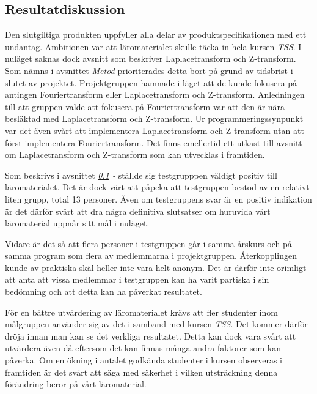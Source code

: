\documentclass[12pt,a4paper,twoside,openright]{article}
\begin{document}
\subsection{Resultatdiskussion}
\label{sec:resDisk}
Den slutgiltiga produkten uppfyller alla delar av
produktspecifikationen med ett undantag. Ambitionen var att
läromaterialet skulle täcka in hela kursen \textit{TSS}. I nuläget
saknas dock avsnitt som beskriver Laplacetransform och
Z-transform. Som nämns i avsnittet \textit{Metod} prioriterades
detta bort på grund av tidsbrist i slutet av projektet. Projektgruppen
hamnade i läget att de kunde fokusera på antingen Fouriertransform
eller Laplacetransform och Z-transform. Anledningen till att
gruppen valde att fokusera på Fouriertransform var att den är nära
besläktad med Laplacetransform och Z-transform. Ur
programmeringssynpunkt var det även svårt att implementera
Laplacetransform och Z-transform utan att först implementera Fouriertransform. Det finns emellertid ett utkast
till avsnitt om Laplacetransform och Z-transform som kan utvecklas i framtiden.

Som beskrivs i avsnittet \textit{\ref{sec:resDisk} - } ställde sig testgrupppen
väldigt positiv till läromaterialet. Det är dock värt att påpeka att
testgruppen bestod av en relativt liten grupp, total 13 personer.
Även om testgruppens svar är en positiv indikation är det därför svårt
att dra några definitiva slutsatser om huruvida vårt läromaterial
uppnår sitt mål i nuläget.

Vidare är det så att flera personer i testgruppen går i samma årskurs
och på samma program som flera av medlemmarna i
projektgruppen. Återkopplingen kunde av praktiska skäl heller inte
vara helt anonym. Det är därför inte orimligt att anta att vissa
medlemmar i testgruppen kan ha varit partiska i sin bedömning och att
detta kan ha påverkat resultatet.

För en bättre utvärdering av läromaterialet krävs att fler studenter
inom målgruppen använder sig av det i samband med kursen
\textit{TSS}. Det kommer därför dröja innan man kan se det verkliga
resultatet. Detta kan dock vara svårt att utvärdera även då eftersom
det kan finnas många andra faktorer som kan påverka. Om en ökning i
antalet godkända studenter i kursen observeras i framtiden är det
svårt att säga med säkerhet i vilken utsträckning denna förändring
beror på vårt läromaterial.

\end{document}
